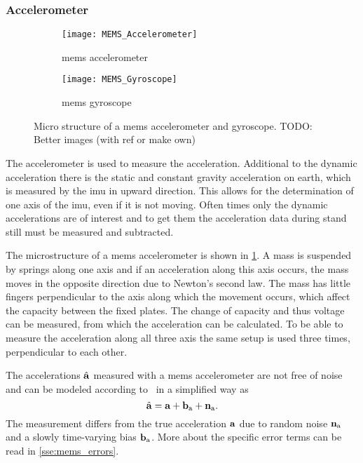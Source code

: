 \subsubsection{ Accelerometer}
\begin{figure}[htb]
    \centering
    \begin{subfigure}{0.48\textwidth}
        \centering
        \texttt{[image: MEMS\_Accelerometer]}
        \caption{\acrshort{mems} accelerometer}
        \label{fig:MEMS_Accelerometer}
    \end{subfigure}
    \begin{subfigure}{0.48\textwidth}
        \centering
        \texttt{[image: MEMS\_Gyroscope]}
        \caption{\acrshort{mems} gyroscope}
        \label{fig:MEMS_Gyroscope}
    \end{subfigure}
    \caption[Micro structure of a \acrshort{mems} accelerometer and gyroscope]{Micro structure of a \acrshort{mems} accelerometer and gyroscope. \color{red}TODO: Better images (with ref or make own)}
    \label{fig:MEMS_design}
\end{figure}
The accelerometer is used to measure the acceleration.
Additional to the dynamic acceleration there is the static and constant gravity acceleration on earth, which is measured by the \gls{imu} in upward direction.
This allows for the determination of one axis of the \gls{imu}, even if it is not moving.
Often times only the dynamic accelerations are of interest and to get them the acceleration data during stand still must be measured and subtracted.\par
The microstructure of a \gls{mems} accelerometer is shown in \cref{fig:MEMS_Accelerometer}.
A mass is suspended by springs along one axis and if an acceleration along this axis occurs, the mass moves in the opposite direction due to Newton's second law.
The mass has little fingers perpendicular to the axis along which the movement occurs, which affect the capacity between the fixed plates.
The change of capacity and thus voltage can be measured, from which the acceleration can be calculated.
To be able to measure the acceleration along all three axis the same setup is used three times, perpendicular to each other.\par
The accelerations $\hat{\vb{a}}$ measured with a \gls{mems} accelerometer are not free of noise and can be modeled according to~\cite{Lefferts1982} in a simplified way as
\begin{equation}
    \hat{\vb{a}} = \vb{a} + \vb{b}_\mathrm{a} + \vb{n}_\mathrm{a}.
\end{equation}
The measurement differs from the true acceleration $\vb{a}$ due to random noise $\vb{n}_\mathrm{a}$ and a slowly time-varying bias $\vb{b}_\mathrm{a}$.
More about the specific error terms can be read in \cref{sse:mems_errors}.

